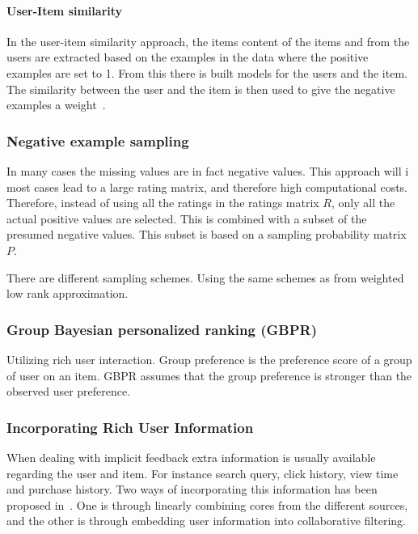     \paragraph{User-Item similarity} %
        \label{subp:user_item_similarity}
        In the user-item similarity approach, the items content of the items and from the users are extracted based on the examples in the data where the positive examples are set to 1.
        From this there is built models for the users and the item.
        The similarity between the user and the item is then used to give the negative examples a weight~\cite{yuan2013}.

\subsubsection{Negative example sampling~\cite{pan2008}}
    In many cases the missing values are in fact negative values.  This approach
    will i most cases lead to a large rating matrix, and therefore high
    computational costs.  Therefore, instead of using all the ratings in the
    ratings matrix $R$, only all the actual positive values are selected.  This is
    combined with a subset of the presumed negative values.  This subset is based
    on a sampling probability matrix $P$.

    There are different sampling schemes.
    Using the same schemes as from weighted low rank approximation.

\subsubsection{Group Bayesian personalized ranking (GBPR)~\cite{Pan:2013:GGP:2540128.2540516}}
    Utilizing rich user interaction.  Group preference is the preference score of a
    group of user on an item.  GBPR assumes that the group preference is stronger
    than the observed user preference.

\subsubsection{Incorporating Rich User Information~\cite{deLace2010,Li2013}}
    When dealing with implicit feedback extra information is usually available
    regarding the user and item.  For instance search query, click history, view
    time and purchase history.  Two ways of incorporating this information has been
    proposed in~\cite{deLace2010}.  One is through linearly combining cores from
    the different sources, and the other is through embedding user information into
    collaborative filtering.

